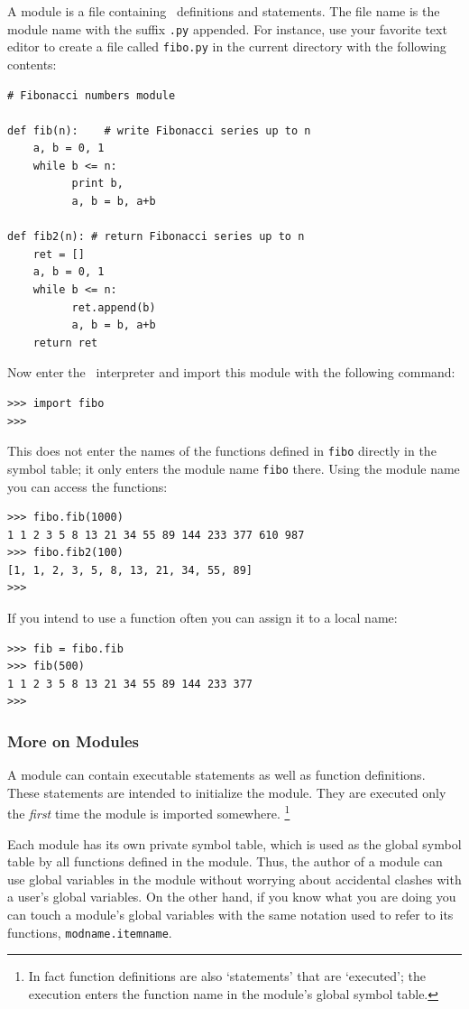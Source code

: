 A module is a file containing \Python\ definitions and statements.
The file name is the module name with the suffix
{\tt .py}
appended.
For instance, use your favorite text editor to create a file called
{\tt fibo.py}
in the current directory with the following contents:
\bcode\begin{verbatim}
# Fibonacci numbers module

def fib(n):    # write Fibonacci series up to n
    a, b = 0, 1
    while b <= n:
          print b,
          a, b = b, a+b

def fib2(n): # return Fibonacci series up to n
    ret = []
    a, b = 0, 1
    while b <= n:
          ret.append(b)
          a, b = b, a+b
    return ret
\end{verbatim}\ecode
Now enter the \Python\ interpreter and import this module with the
following command:
\bcode\begin{verbatim}
>>> import fibo
>>> 
\end{verbatim}\ecode
This does not enter the names of the functions defined in
{\tt fibo}
directly in the symbol table; it only enters the module name
{\tt fibo}
there.
Using the module name you can access the functions:
\bcode\begin{verbatim}
>>> fibo.fib(1000)
1 1 2 3 5 8 13 21 34 55 89 144 233 377 610 987
>>> fibo.fib2(100)
[1, 1, 2, 3, 5, 8, 13, 21, 34, 55, 89]
>>> 
\end{verbatim}\ecode
If you intend to use a function often you can assign it to a local name:
\bcode\begin{verbatim}
>>> fib = fibo.fib
>>> fib(500)
1 1 2 3 5 8 13 21 34 55 89 144 233 377
>>> 
\end{verbatim}\ecode

\subsubsection{More on Modules}

A module can contain executable statements as well as function
definitions.
These statements are intended to initialize the module.
They are executed only the
{\em first}
time the module is imported somewhere.%
\footnote{
	In fact function definitions are also `statements' that are
	`executed'; the execution enters the function name in the
	module's global symbol table.
}

Each module has its own private symbol table, which is used as the
global symbol table by all functions defined in the module.
Thus, the author of a module can use global variables in the module
without worrying about accidental clashes with a user's global
variables.
On the other hand, if you know what you are doing you can touch a
module's global variables with the same notation used to refer to its
functions,
{\tt modname.itemname}.

